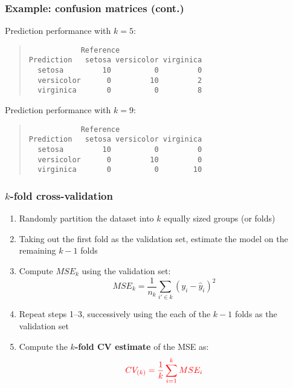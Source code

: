 \documentclass[smaller]{beamer}
\newcommand{\?}{\stackrel{?}{=}}
\newcommand{\fr}{\frac}
\newcommand{\rd}{\color{red}}
\newcommand{\bl}{\color{blue}}
\begin{document}
\begin{frame}[fragile]
  \frametitle{Example: confusion matrices (cont.)}
  Prediction performance with $k=5$:\pause
  
  \begin{quote}\small\rd
\begin{verbatim}
            Reference
Prediction   setosa versicolor virginica
  setosa         10          0         0
  versicolor      0         10         2
  virginica       0          0         8
\end{verbatim}
  \end{quote}
  \pause

  \bigskip
  
  Prediction performance with $k=9$:\pause
  
  \begin{quote}\small\bl
\begin{verbatim}
            Reference
Prediction   setosa versicolor virginica
  setosa         10          0         0
  versicolor      0         10         0
  virginica       0          0        10
\end{verbatim}
  \end{quote}
\end{frame}
\begin{frame}
  \frametitle{$k$-fold cross-validation}
  \pause
  \begin{enumerate}[<+->]
  \item Randomly partition the dataset into  $k$ equally sized groups (or folds)
  \item Taking out the first fold as the validation set, estimate the model on the remaining $k-1$ folds
  \item Compute $MSE_k$ using the validation set:\pause
    \begin{equation}
      MSE_k = \fr1{n_k}\sum_{i'\in k} (y_i - \hat y_i)^2
    \end{equation}
  \item Repeat steps 1--3, successively using the each of the $k-1$ folds as the validation set
  \item Compute the \textbf{\rd $k$-fold CV estimate} of the MSE as:\pause
    \begin{equation}
      \label{eq:15}\rd
      CV_{(k)} = \fr1k \sum_{i=1}^k MSE_i
    \end{equation}
  \end{enumerate}
\end{frame}
\end{document}
